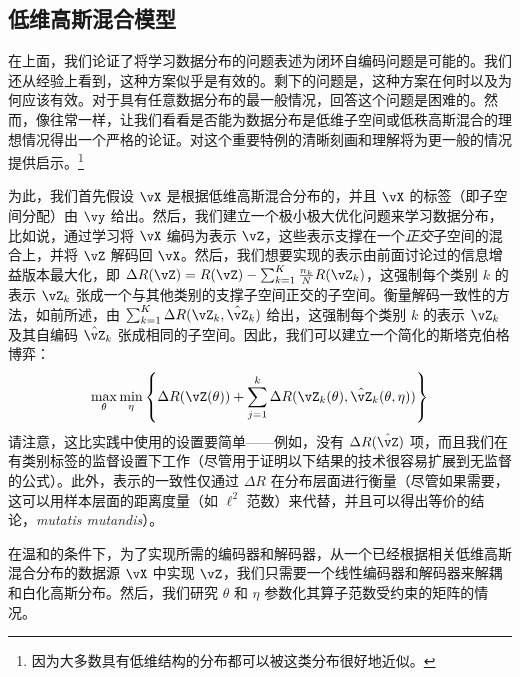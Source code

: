 \documentclass[../../book-main.tex]{subfiles}
\begin{document}
\subsection{低维高斯混合模型}

在上面，我们论证了将学习数据分布的问题表述为闭环自编码问题是可能的。我们还从经验上看到，这种方案似乎是有效的。剩下的问题是，这种方案在何时以及为何应该有效。对于具有任意数据分布的最一般情况，回答这个问题是困难的。然而，像往常一样，让我们看看是否能为数据分布是低维子空间或低秩高斯混合的理想情况得出一个严格的论证。对这个重要特例的清晰刻画和理解将为更一般的情况提供启示。\footnote{因为大多数具有低维结构的分布都可以被这类分布很好地近似。}

为此，我们首先假设 \(\vX\) 是根据低维高斯混合分布的，并且 \(\vX\) 的标签（即子空间分配）由 \(\vy\) 给出。然后，我们建立一个极小极大优化问题来学习数据分布，比如说，通过学习将 \(\vX\) 编码为表示 \(\vZ\)，这些表示支撑在一个\textit{正交}子空间的混合上，并将 \(\vZ\) 解码回 \(\vX\)。然后，我们想要实现的表示由前面讨论过的信息增益版本最大化，即 \(\Delta R(\vZ) = R(\vZ) - \sum_{k = 1}^{K}\frac{n_{k}}{N}R(\vZ_{k})\)，这强制每个类别 \(k\) 的表示 \(\vZ_{k}\) 张成一个与其他类别的支撑子空间正交的子空间。衡量解码一致性的方法，如前所述，由 \(\sum_{k = 1}^{K}\Delta R(\vZ_{k}, \hat{\vZ}_{k})\) 给出，这强制每个类别 \(k\) 的表示 \(\vZ_{k}\) 及其自编码 \(\hat{\vZ}_{k}\) 张成相同的子空间。因此，我们可以建立一个简化的斯塔克伯格博弈：
\begin{equation}\label{eq:ctrl_msp_game}
    \max_{\theta}\min_{\eta}\bc{\Delta R(\vZ(\theta)) + \sum_{j = 1}^{k}\Delta R(\vZ_{k}(\theta), \hat{\vZ}_{k}(\theta, \eta))}
\end{equation}
请注意，这比实践中使用的设置要简单——例如，没有 \(\Delta R(\hat{\vZ})\) 项，而且我们在有类别标签的监督设置下工作（尽管用于证明以下结果的技术很容易扩展到无监督的公式）。此外，表示的一致性仅通过 \(\Delta R\) 在分布层面进行衡量（尽管如果需要，这可以用样本层面的距离度量（如 \(\ell^{2}\) 范数）来代替，并且可以得出等价的结论，\textit{mutatis mutandis}）。

在温和的条件下，为了实现所需的编码器和解码器，从一个已经根据相关低维高斯混合分布的数据源 \(\vX\) 中实现 \(\vZ\)，我们只需要一个线性编码器和解码器来解耦和白化高斯分布。然后，我们研究 \(\theta\) 和 \(\eta\) 参数化其算子范数受约束的矩阵的情况。
\end{document}
